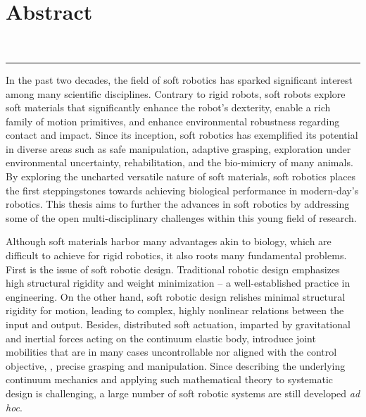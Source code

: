 \chapter*{\vspace{-30mm}\\ \huge{Abstract}} %
\vspace{-0mm}
\begin{center}
\textbf{{\large \maintitle} \\[0.05em]
}
\rule{\textwidth}{.75pt}
\end{center} 

\vspace{-2mm}
In the past two decades, the field of soft robotics has sparked significant interest among many scientific disciplines. Contrary to rigid robots, soft robots explore soft materials that significantly enhance the robot's dexterity, enable a rich family of motion primitives, and enhance environmental robustness regarding contact and impact. Since its inception, soft robotics has exemplified its potential in diverse areas such as safe manipulation, adaptive grasping, exploration under environmental uncertainty, rehabilitation, and the bio-mimicry of many animals. By exploring the uncharted versatile nature of soft materials, soft robotics places the first steppingstones towards achieving biological performance in modern-day's robotics. This thesis aims to further the advances in soft robotics by addressing some of the open multi-disciplinary challenges within this young field of research. 

Although soft materials harbor many advantages akin to biology, which are difficult to achieve for rigid robotics, it also roots many fundamental problems. First is the issue of soft robotic design. Traditional robotic design emphasizes high structural rigidity and weight minimization -- a well-established practice in engineering. On the other hand, soft robotic design relishes minimal structural rigidity for motion, leading to complex, highly nonlinear relations between the input and output. Besides, distributed soft actuation, imparted by gravitational and inertial forces acting on the continuum elastic body, introduce joint mobilities that are in many cases uncontrollable nor aligned with the control objective, \eg, precise grasping and manipulation. Since describing the underlying continuum mechanics and applying such mathematical theory to systematic design is challenging, a large number of soft robotic systems are still developed \textit{ad hoc}. 

